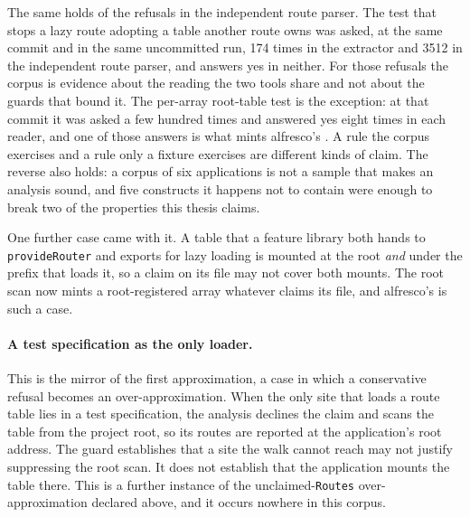 The same holds of the refusals in the independent route parser. The test that stops a lazy route adopting a table another route owns was asked, at the same commit and in the same uncommitted run, 174 times in the extractor and 3512 in the independent route parser, and answers yes in neither. For those refusals the corpus is evidence about the reading the two tools share and not about the guards that bound it. The per-array root-table test is the exception: at that commit it was asked a few hundred times and answered yes eight times in each reader, and one of those answers is what mints alfresco's . A rule the corpus exercises and a rule only a fixture exercises are different kinds of claim. The reverse also holds: a corpus of six applications is not a sample that makes an analysis sound, and five constructs it happens not to contain were enough to break two of the properties this thesis claims.

One further case came with it. A table that a feature library both hands to \texttt{provideRouter} and exports for lazy loading is mounted at the root \emph{and} under the prefix that loads it, so a claim on its file may not cover both mounts. The root scan now mints a root-registered array whatever claims its file, and alfresco's  is such a case.

\paragraph{A test specification as the only loader.} This is the mirror of the first approximation, a case in which a conservative refusal becomes an over-approximation. When the only site that loads a route table lies in a test specification, the analysis declines the claim and scans the table from the project root, so its routes are reported at the application's root address. The guard establishes that a site the walk cannot reach may not justify suppressing the root scan. It does not establish that the application mounts the table there. This is a further instance of the unclaimed-\texttt{Routes} over-approximation declared above, and it occurs nowhere in this corpus.

